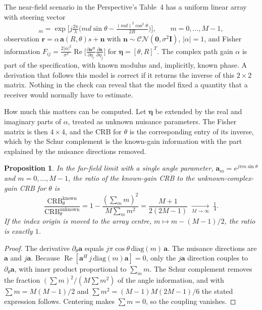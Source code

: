 \documentclass[11pt]{article}
\newtheorem{proposition}{Proposition}
\theoremstyle{definition}
\renewcommand{\Re}{\operatorname{Re}}
\begin{document}
The near-field scenario in the Perspective's Table~4 has a uniform linear array with steering vector
\begin{equation}
[\mathbf a(R,\theta)]_m = \exp\!\Big[j\tfrac{2\pi}{\lambda}\Big(md\sin\theta-\tfrac{(md)^2\cos^2\theta}{2R}\Big)\Big],\qquad m=0,\dots,M-1,
\end{equation}
observation $\mathbf r=\alpha\,\mathbf a(R,\theta)s+\mathbf n$ with $\mathbf n\sim\mathcal{CN}(\mathbf 0,\sigma^2\mathbf I)$, $|\alpha|=1$, and Fisher information $F_{ij}=\tfrac{2|\alpha|^2}{\sigma^2}\Re\big[\tfrac{\partial\mathbf a^H}{\partial\eta_i}\tfrac{\partial\mathbf a}{\partial\eta_j}\big]$ for $\boldsymbol\eta=[\theta,R]^T$. The complex path gain $\alpha$ is part of the specification, with known modulus and, implicitly, known phase. A derivation that follows this model is correct if it returns the inverse of this $2\times2$ matrix. Nothing in the check can reveal that the model fixed a quantity that a receiver would normally have to estimate.

How much this matters can be computed. Let $\boldsymbol\eta$ be extended by the real and imaginary parts of $\alpha$, treated as unknown nuisance parameters. The Fisher matrix is then $4\times4$, and the CRB for $\theta$ is the corresponding entry of its inverse, which by the Schur complement is the known-gain information with the part explained by the nuisance directions removed.

\begin{proposition}
In the far-field limit with a single angle parameter, $\mathbf a_m=e^{j\pi m\sin\theta}$ and $m=0,\dots,M-1$, the ratio of the known-gain CRB to the unknown-complex-gain CRB for $\theta$ is
\begin{equation}
\frac{\mathrm{CRB}^{\mathrm{known}}_\theta}{\mathrm{CRB}^{\mathrm{unknown}}_\theta}
=1-\frac{(\sum_m m)^2}{M\sum_m m^2}=\frac{M+1}{2(2M-1)}\;\xrightarrow[M\to\infty]{}\;\tfrac14 .
\end{equation}
If the index origin is moved to the array centre, $m\mapsto m-(M-1)/2$, the ratio is exactly $1$.
\end{proposition}

\begin{proof}
The derivative $\partial_\theta\mathbf a$ equals $j\pi\cos\theta\,\mathrm{diag}(m)\,\mathbf a$. The nuisance directions are $\mathbf a$ and $j\mathbf a$. Because $\Re[\mathbf a^H\,j\,\mathrm{diag}(m)\mathbf a]=0$, only the $j\mathbf a$ direction couples to $\partial_\theta\mathbf a$, with inner product proportional to $\sum_m m$. The Schur complement removes the fraction $(\sum m)^2/(M\sum m^2)$ of the angle information, and with $\sum m=M(M-1)/2$ and $\sum m^2=(M-1)M(2M-1)/6$ the stated expression follows. Centering makes $\sum m=0$, so the coupling vanishes.
\end{proof}
\end{document}
